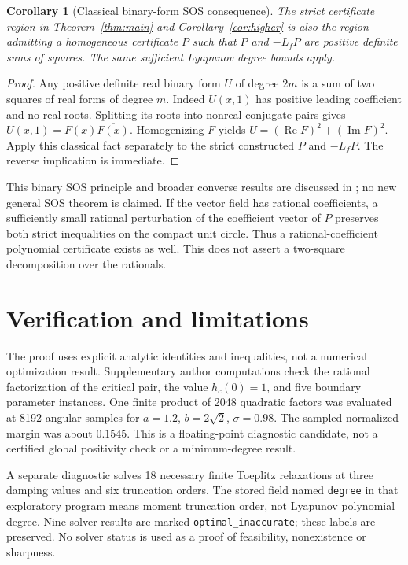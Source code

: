 \documentclass[11pt]{article}
\newtheorem{corollary}[theorem]{Corollary}
\theoremstyle{remark}\newtheorem{remark}[theorem]{Remark}
\newcommand{\Rea}{\operatorname{Re}}
\newcommand{\Ima}{\operatorname{Im}}
\begin{document}
\begin{corollary}[Classical binary-form SOS consequence]\label{cor:sos}
The strict certificate region in Theorem~\ref{thm:main} and
Corollary~\ref{cor:higher} is also the region admitting a
homogeneous certificate \(P\) such that \(P\) and \(-L_fP\)
are positive definite sums of squares.
The same sufficient Lyapunov degree bounds apply.
\end{corollary}
\begin{proof}
Any positive definite real binary form \(U\) of degree \(2m\)
is a sum of two squares of real forms of degree \(m\).
Indeed \(U(x,1)\) has positive leading coefficient and no real
roots. Splitting its roots into nonreal conjugate pairs gives
\(U(x,1)=F(x)\overline{F(x)}\). Homogenizing \(F\) yields
\(U=(\Rea F)^2+(\Ima F)^2\).
Apply this classical fact separately to the strict constructed
\(P\) and \(-L_fP\). The reverse implication is immediate.
\end{proof}
This binary SOS principle and broader converse results are
discussed in \cite[Section 5 and Theorem 5.3]{ahmadi-parrilo};
no new general SOS theorem is claimed.
If the vector field has rational coefficients, a sufficiently
small rational perturbation of the coefficient vector of \(P\)
preserves both strict inequalities on the compact unit circle.
Thus a rational-coefficient polynomial certificate exists as well.
This does not assert a two-square decomposition over the rationals.

\section{Verification and limitations}
The proof uses explicit analytic identities and inequalities, not
a numerical optimization result. Supplementary author computations
check the rational factorization of the critical pair, the value
\(h_c(0)=1\), and five boundary parameter instances.
One finite product of 2048 quadratic factors was evaluated at
8192 angular samples for \(a=1.2\), \(b=2\sqrt2\),
\(\sigma=0.98\). The sampled normalized margin was about
\(0.1545\). This is a floating-point diagnostic candidate,
not a certified global positivity check or a minimum-degree result.

A separate diagnostic solves 18 necessary finite Toeplitz
relaxations at three damping values and six truncation orders.
The stored field named \texttt{degree} in that exploratory program
means moment truncation order, not Lyapunov polynomial degree.
Nine solver results are marked \texttt{optimal\_inaccurate};
these labels are preserved. No solver status is used as a proof
of feasibility, nonexistence or sharpness.
\end{document}

